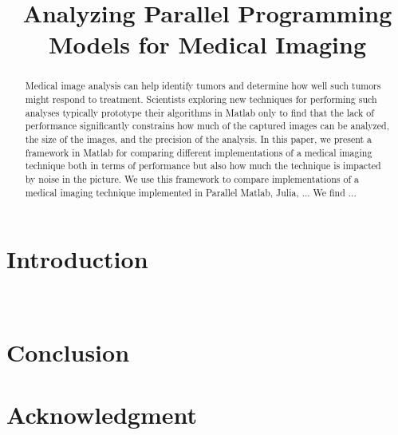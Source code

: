 \documentclass[conference]{IEEEtran}
\begin{document}
\title{Analyzing Parallel Programming Models for Medical Imaging}


\author{
\and
{}
}

\maketitle

\begin{abstract}
Medical image analysis can help identify tumors and determine how well such
tumors might respond to treatment.
Scientists exploring new techniques for performing such analyses typically
prototype their algorithms in Matlab only to find that the lack of performance
significantly constrains how much of the captured images can be analyzed,
the size of the images, and the precision of the analysis.
In this paper, we present a framework in Matlab for comparing different implementations
of a medical imaging technique both in terms of performance but
also how much the technique is impacted by noise in the picture.
We use this framework to compare implementations of a medical imaging
technique implemented in Parallel Matlab, Julia, ...
We find ...
\end{abstract}

\IEEEpeerreviewmaketitle


\section{Introduction}

~\cite{Luszczek2009}

\section{Conclusion}




\section*{Acknowledgment}




\end{document}

